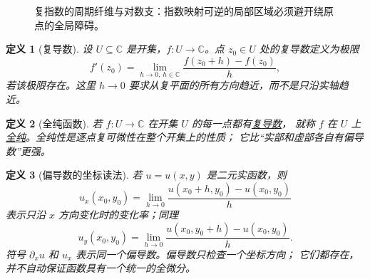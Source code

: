 \documentclass[UTF8,fontset=none,a4paper,11pt]{ctexart}
\theoremstyle{foundation-definition}
\newtheorem{definition}{定义}[section]
\theoremstyle{foundation-theorem}
\theoremstyle{foundation-proposition}
\theoremstyle{foundation-example}
\theoremstyle{foundation-remark}
\theoremstyle{foundation-theorem}
\newcommand{\C}{\mathbb C}
\newcommand{\term}[2]{\hyperref[#1]{#2}}
\begin{document}
\begin{figure}[htbp]
\centering
{}
\caption{复指数的周期纤维与对数支：指数映射可逆的局部区域必须避开绕原点的全局障碍。}
\label{fig:complex-exponential-periodicity}
\end{figure}

\begin{definition}[复导数]\label{def:complex-derivative}
设 \(U\subseteq\C\) 是开集，\(f:U\to\C\)。点 \(z_0\in U\) 处的复导数定义为极限
\[
f'(z_0)=\lim_{h\to0,\,h\in\C}
\frac{f(z_0+h)-f(z_0)}{h},
\]
若该极限存在。这里 \(h\to0\) 要求从复平面的所有方向趋近，而不是只沿实轴趋近。
\end{definition}

\begin{definition}[全纯函数]\label{def:holomorphic}
若 \(f:U\to\C\) 在开集 \(U\) 的每一点都有\term{def:complex-derivative}{复导数}，
就称 \(f\) 在 \(U\) 上\term{def:holomorphic}{全纯}。全纯性是逐点复可微性在整个开集上的性质；
它比“实部和虚部各自有偏导数”更强。
\end{definition}

\begin{definition}[偏导数的坐标读法]\label{def:partial-derivative}
若 \(u=u(x,y)\) 是二元实函数，则
\[
u_x(x_0,y_0)
=\lim_{h\to0}
\frac{u(x_0+h,y_0)-u(x_0,y_0)}{h}
\]
表示只沿 \(x\) 方向变化时的变化率；同理
\[
u_y(x_0,y_0)
=\lim_{h\to0}
\frac{u(x_0,y_0+h)-u(x_0,y_0)}{h}.
\]
符号 \(\partial_xu\) 和 \(u_x\) 表示同一个偏导数。偏导数只检查一个坐标方向；
它们都存在，并不自动保证函数具有一个统一的全微分。
\end{definition}
\end{document}
